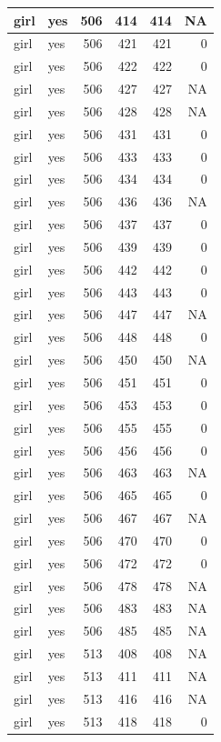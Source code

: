 \documentclass[man]{apa6}
\begin{document}
\begin{tabular}{l|l|r|r|r|r}
\hline
girl & yes & 506 & 414 & 414 & NA\\
\hline
girl & yes & 506 & 421 & 421 & 0\\
\hline
girl & yes & 506 & 422 & 422 & 0\\
\hline
girl & yes & 506 & 427 & 427 & NA\\
\hline
girl & yes & 506 & 428 & 428 & NA\\
\hline
girl & yes & 506 & 431 & 431 & 0\\
\hline
girl & yes & 506 & 433 & 433 & 0\\
\hline
girl & yes & 506 & 434 & 434 & 0\\
\hline
girl & yes & 506 & 436 & 436 & NA\\
\hline
girl & yes & 506 & 437 & 437 & 0\\
\hline
girl & yes & 506 & 439 & 439 & 0\\
\hline
girl & yes & 506 & 442 & 442 & 0\\
\hline
girl & yes & 506 & 443 & 443 & 0\\
\hline
girl & yes & 506 & 447 & 447 & NA\\
\hline
girl & yes & 506 & 448 & 448 & 0\\
\hline
girl & yes & 506 & 450 & 450 & NA\\
\hline
girl & yes & 506 & 451 & 451 & 0\\
\hline
girl & yes & 506 & 453 & 453 & 0\\
\hline
girl & yes & 506 & 455 & 455 & 0\\
\hline
girl & yes & 506 & 456 & 456 & 0\\
\hline
girl & yes & 506 & 463 & 463 & NA\\
\hline
girl & yes & 506 & 465 & 465 & 0\\
\hline
girl & yes & 506 & 467 & 467 & NA\\
\hline
girl & yes & 506 & 470 & 470 & 0\\
\hline
girl & yes & 506 & 472 & 472 & 0\\
\hline
girl & yes & 506 & 478 & 478 & NA\\
\hline
girl & yes & 506 & 483 & 483 & NA\\
\hline
girl & yes & 506 & 485 & 485 & NA\\
\hline
girl & yes & 513 & 408 & 408 & NA\\
\hline
girl & yes & 513 & 411 & 411 & NA\\
\hline
girl & yes & 513 & 416 & 416 & NA\\
\hline
girl & yes & 513 & 418 & 418 & 0\\

\end{tabular}
\end{document}
